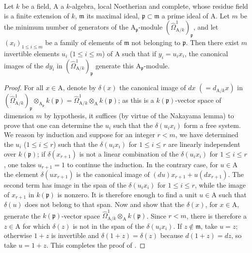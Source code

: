\begin{lemma}[18.11.5.2]
\label{IV.18.11.5.2}
Let $k$ be a field, $\mathrm{A}$ a $k$-algebra, local Noetherian and complete, whose residue field is a finite extension of $k$, $\mathfrak{m}$ its maximal ideal, $\mathfrak{p}\subset\mathfrak{m}$ a prime ideal of $\mathrm{A}$.
Let $m$ be the minimum number of generators of the $\mathrm{A}_\mathfrak{p}$-module $(\hat{\Omega}^1_{\mathrm{A}/k})_\mathfrak{p}$, and let $(x_i)_{1\leq i\leq m}$ be a family of elements of $\mathfrak{m}$ not belonging to $\mathfrak{p}$.
Then there exist $m$ invertible elements $u_i$ ($1\leq i\leq m$) of $\mathrm{A}$ such that if $y_i=u_ix_i$, the canonical images of the $dy_i$ in $(\hat{\Omega}^1_{\mathrm{A}/k})_\mathfrak{p}$ generate this $\mathrm{A}_\mathfrak{p}$-module.
\end{lemma}

\begin{proof}
For all $x\in\mathrm{A}$, denote by $\delta(x)$ the canonical image of $dx$ $(=d_{\mathrm{A}/k}x)$ in $(\hat{\Omega}^1_{\mathrm{A}/k})_\mathfrak{p}\otimes_{\mathrm{A}_\mathfrak{p}}k(\mathfrak{p})=\hat{\Omega}^1_{\mathrm{A}/k}\otimes_{\mathrm{A}}k(\mathfrak{p})$; as this is a $k(\mathfrak{p})$-vector space of dimension $m$ by hypothesis, it suffices (by virtue of the Nakayama lemma) to prove that one can determine the $u_i$ such that the $\delta(u_ix_i)$ form a free system.
We reason by induction and suppose for an integer $r<m$, we have determined the $u_i$ ($1\leq i\leq r$) such that the $\delta(u_ix_i)$ for $1\leq i\leq r$ are linearly independent over $k(\mathfrak{p})$; if $\delta(x_{r+1})$ is not a linear combination of the $\delta(u_ix_i)$ for $1\leq i\leq r$, one takes $u_{r+1}=1$ to continue the induction.
In the contrary case, for $u\in\mathrm{A}$ the element $\delta(ux_{r+1})$ is the canonical image of $(du)x_{r+1}+u(dx_{r+1})$. The second term has image in the span of the $\delta(u_ix_i)$ for $1\leq i\leq r$, while the image of $x_{r+1}$ in $k(\mathfrak p)$ is nonzero. It is therefore enough to find a unit $u\in\mathrm{A}$ such that $\delta(u)$ does not belong to that span.
Now  and  show that the $\delta(x)$, for $x\in\mathrm{A}$, generate the $k(\mathfrak p)$-vector space $\hat{\Omega}^1_{\mathrm{A}/k}\otimes_{\mathrm{A}}k(\mathfrak p)$. Since $r<m$, there is therefore a $z\in\mathrm{A}$ for which $\delta(z)$ is not in the span of the $\delta(u_ix_i)$. If $z\notin\mathfrak m$, take $u=z$; otherwise $1+z$ is invertible and $\delta(1+z)=\delta(z)$ because $d(1+z)=dz$, so take $u=1+z$. This completes the proof of .
\end{proof}

